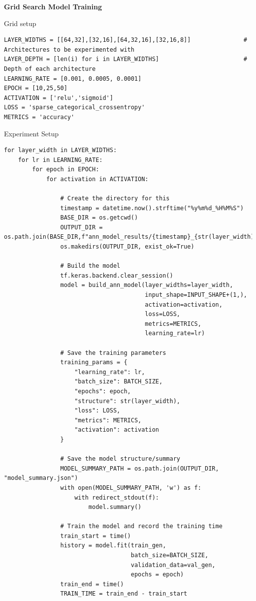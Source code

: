 \documentclass[a4paper]{article}
\begin{document}
\textbf{Grid Search Model Training}

Grid setup
\begin{lstlisting}
LAYER_WIDTHS = [[64,32],[32,16],[64,32,16],[32,16,8]]               # Architectures to be experimented with
LAYER_DEPTH = [len(i) for i in LAYER_WIDTHS]                        # Depth of each architecture
LEARNING_RATE = [0.001, 0.0005, 0.0001]
EPOCH = [10,25,50]
ACTIVATION = ['relu','sigmoid']
LOSS = 'sparse_categorical_crossentropy'
METRICS = 'accuracy'
\end{lstlisting}

Experiment Setup
\begin{lstlisting}
for layer_width in LAYER_WIDTHS:
    for lr in LEARNING_RATE:
        for epoch in EPOCH:
            for activation in ACTIVATION:

                # Create the directory for this 
                timestamp = datetime.now().strftime("%y%m%d_%H%M%S")
                BASE_DIR = os.getcwd()
                OUTPUT_DIR = os.path.join(BASE_DIR,f"ann_model_results/{timestamp}_{str(layer_width)}_{lr}_{epoch}_{activation}")
                os.makedirs(OUTPUT_DIR, exist_ok=True)

                # Build the model
                tf.keras.backend.clear_session()
                model = build_ann_model(layer_widths=layer_width,
                                        input_shape=INPUT_SHAPE+(1,),
                                        activation=activation,
                                        loss=LOSS,
                                        metrics=METRICS,
                                        learning_rate=lr)
                
                # Save the training parameters
                training_params = {
                    "learning_rate": lr,
                    "batch_size": BATCH_SIZE,
                    "epochs": epoch,
                    "structure": str(layer_width),
                    "loss": LOSS,
                    "metrics": METRICS,
                    "activation": activation
                }

                # Save the model structure/summary
                MODEL_SUMMARY_PATH = os.path.join(OUTPUT_DIR, "model_summary.json")
                with open(MODEL_SUMMARY_PATH, 'w') as f:
                    with redirect_stdout(f):
                        model.summary()

                # Train the model and record the training time
                train_start = time()
                history = model.fit(train_gen,
                                    batch_size=BATCH_SIZE,
                                    validation_data=val_gen,
                                    epochs = epoch)
                train_end = time()
                TRAIN_TIME = train_end - train_start


\end{lstlisting}
\end{document}
